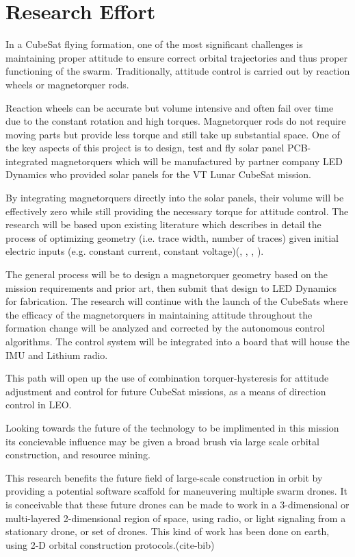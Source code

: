 \section{Research Effort}

In a CubeSat flying formation, one of the most significant challenges
is maintaining proper attitude to ensure correct orbital trajectories
and thus proper functioning of the swarm. Traditionally, attitude
control is carried out by reaction wheels or magnetorquer
rods.

Reaction wheels can be accurate but volume intensive and often
fail over time due to the constant rotation and high
torques. Magnetorquer rods do not require moving parts but provide
less torque and still take up substantial space. One of the key
aspects of this project is to design, test and fly solar panel
PCB-integrated magnetorquers which will be manufactured by partner
company LED Dynamics who provided solar panels for the VT Lunar
CubeSat mission.

By integrating magnetorquers directly into the solar panels, their
volume will be effectively zero while still providing the necessary
torque for attitude control. The research will be based upon existing
literature which describes in detail the process of optimizing
geometry (i.e. trace width, number of traces) given initial electric
inputs (e.g. constant current, constant voltage)(\cite{ali:2021},
\cite{khan:2022}, \cite{sokal:2019}, \cite{sorensen:2021}).

 The general process will be to design a magnetorquer geometry based
 on the mission requirements and prior art, then submit that design to
 LED Dynamics for fabrication. The research will continue with the
 launch of the CubeSats where the efficacy of the magnetorquers in
 maintaining attitude throughout the formation change will be analyzed
 and corrected by the autonomous control algorithms. The control
 system will be integrated into a board that will house the IMU and
 Lithium radio.

This path will open up the use of combination torquer-hysteresis for
attitude adjustment and control for future CubeSat missions, as a
means of direction control in LEO.

Looking towards the future of the technology to be implimented in this
mission its concievable influence may be given a broad brush via large
scale orbital construction, and resource mining.

This research benefits the future field of large-scale construction in
orbit by providing a potential software scaffold for maneuvering
multiple swarm drones. It is conceivable that these future drones can
be made to work in a 3-dimensional or multi-layered 2-dimensional
region of space, using radio, or light signaling from a stationary
drone, or set of drones. This kind of work has been done on earth,
using 2-D orbital construction protocols.(cite-bib)

